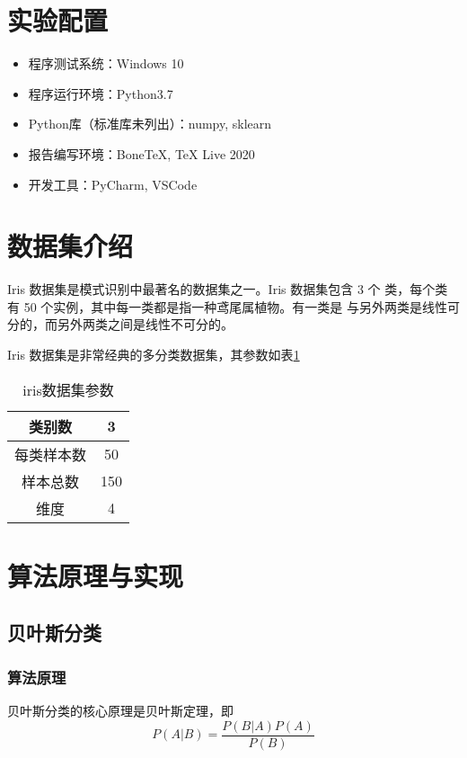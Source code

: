 \documentclass[cn,hazy,blue,14pt,normal]{elegantnote}
\begin{document}


\section{实验配置}
\begin{itemize}
    \item 程序测试系统：Windows 10
    \item 程序运行环境：Python3.7
    \item Python库（标准库未列出）：numpy, sklearn
    \item 报告编写环境：Bone\TeX{}, \TeX{} Live 2020
    \item 开发工具：PyCharm, VSCode
\end{itemize}

\section{数据集介绍}
Iris 数据集是模式识别中最著名的数据集之一。Iris 数据集包含 3 个
类，每个类有 50 个实例，其中每一类都是指一种鸢尾属植物。有一类是
与另外两类是线性可分的，而另外两类之间是线性不可分的。

Iris 数据集是非常经典的多分类数据集，其参数如表\ref{tab:3078999826376}

\begin{table}[htbp]
    \centering
    \caption{iris数据集参数}
    \label{tab:3078999826376}
    \begin{tabular}{|c|c|}
        \hline
        类别数     & 3   \\
        \hline
        每类样本数 & 50  \\
        \hline
        样本总数   & 150 \\
        \hline
        维度       & 4   \\
        \hline
    \end{tabular}
\end{table}

\section{算法原理与实现}
\subsection{贝叶斯分类}
\subsubsection{算法原理}
贝叶斯分类的核心原理是贝叶斯定理，即
\begin{equation}
    P(A|B) = \frac{P(B|A)P(A)}{P(B)}
\end{equation}
\end{document}
